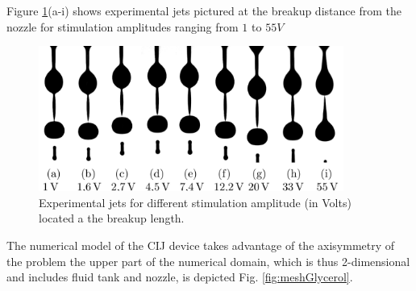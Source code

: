 \documentclass[twocolumn,10pt]{asme2ej}
\begin{document}
Figure \ref{fig:glycerolCIJExp}(a-i) shows experimental jets pictured at the breakup distance from the nozzle for stimulation amplitudes ranging from $1$ to $55V$

\begin{figure}[t]
    \centering
    \includegraphics[width=10cm]{Glycerol/gouttes_exp.png}
    \caption{Experimental jets for different stimulation amplitude (in Volts) located a the breakup length.}
    \label{fig:glycerolCIJExp}
\end{figure}

The numerical model of the CIJ device takes advantage of the axisymmetry of the problem the upper part of the numerical domain, which is thus 2-dimensional and includes fluid tank and nozzle, is depicted Fig. \ref{fig:meshGlycerol}. 
\end{document}
